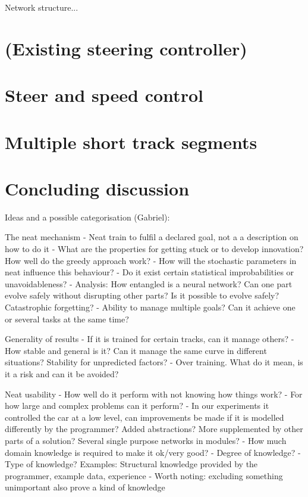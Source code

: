 Network structure...


\section{(Existing steering controller)}

\section{Steer and speed control}

\section{Multiple short track segments}

\section{Concluding discussion}
%
Ideas and a possible categorisation (Gabriel):

The neat mechanism
- Neat train to fulfil a declared goal, not a a description on how to do it
- What are the properties for getting stuck or to develop innovation? How well do the greedy approach work?
- How will the stochastic parameters in neat influence this behaviour?
- Do it exist certain statistical improbabilities or unavoidableness?
- Analysis: How entangled is a neural network? Can one part evolve safely without disrupting other parts? Is it possible to evolve safely? Catastrophic forgetting?
- Ability to manage multiple goals? Can it achieve one or several tasks at the same time?


Generality of results
- If it is trained for certain tracks, can it manage others?
- How stable and general is it? Can it manage the same curve in different situations? Stability for unpredicted factors?
- Over training. What do it mean, is it a risk and can it be avoided?


Neat usability
- How well do it perform with not knowing how things work?
- For how large and complex problems can it perform?
- In our experiments it controlled the car at a low level, can improvements be made if it is modelled differently by the programmer? Added abstractions? More supplemented by other parts of a solution? Several single purpose networks in modules?
- How much domain knowledge is required to make it ok/very good?
  - Degree of knowledge?
  - Type of knowledge? Examples: Structural knowledge provided by the programmer, example data, experience
  - Worth noting: excluding something unimportant also prove a kind of knowledge


